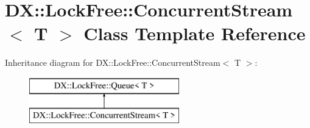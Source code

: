 \hypertarget{class_d_x_1_1_lock_free_1_1_concurrent_stream}{\section{D\-X\-:\-:Lock\-Free\-:\-:Concurrent\-Stream$<$ T $>$ Class Template Reference}
\label{class_d_x_1_1_lock_free_1_1_concurrent_stream}
}
Inheritance diagram for D\-X\-:\-:Lock\-Free\-:\-:Concurrent\-Stream$<$ T $>$\-:\begin{figure}[H]
\begin{center}
\leavevmode
\includegraphics[height=2.000000cm]{class_d_x_1_1_lock_free_1_1_concurrent_stream}
\end{center}
\end{figure}
